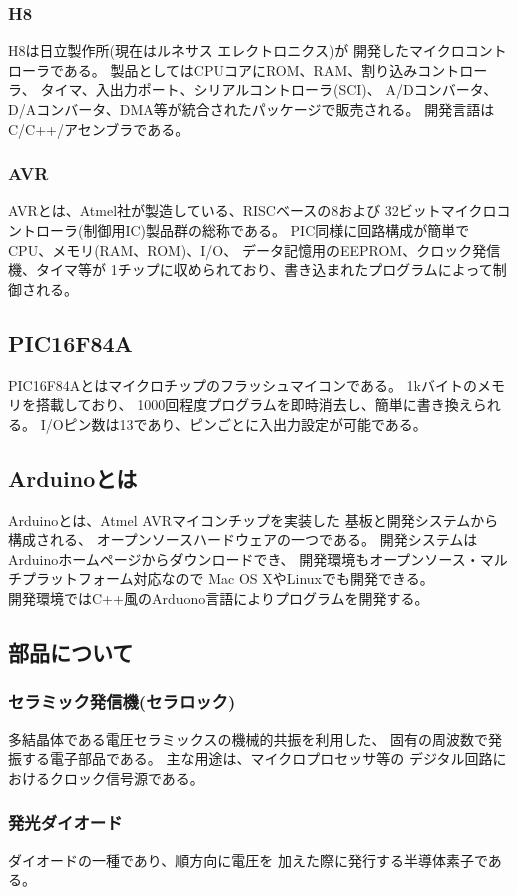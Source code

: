 \documentclass{jsarticle}
\begin{document}
\subsubsection{H8}
H8は日立製作所(現在はルネサス エレクトロニクス)が
開発したマイクロコントローラである。
製品としてはCPUコアにROM、RAM、割り込みコントローラ、
タイマ、入出力ポート、シリアルコントローラ(SCI)、
A/Dコンバータ、D/Aコンバータ、DMA等が統合されたパッケージで販売される。
開発言語はC/C++/アセンブラである。

\subsubsection{AVR}
AVRとは、Atmel社が製造している、RISCベースの8および
32ビットマイクロコントローラ(制御用IC)製品群の総称である。
PIC同様に回路構成が簡単でCPU、メモリ(RAM、ROM)、I/O、
データ記憶用のEEPROM、クロック発信機、タイマ等が
1チップに収められており、書き込まれたプログラムによって制御される。\par

\subsection{PIC16F84A}
PIC16F84Aとはマイクロチップのフラッシュマイコンである。
1kバイトのメモリを搭載しており、
1000回程度プログラムを即時消去し、簡単に書き換えられる。
I/Oピン数は13であり、ピンごとに入出力設定が可能である。

\subsection{Arduinoとは}
Arduinoとは、Atmel AVRマイコンチップを実装した
基板と開発システムから構成される、
オープンソースハードウェアの一つである。
開発システムはArduinoホームページからダウンロードでき、
開発環境もオープンソース・マルチプラットフォーム対応なので
Mac OS XやLinuxでも開発できる。\\
開発環境ではC++風のArduono言語によりプログラムを開発する。

\subsection{部品について}
\subsubsection{セラミック発信機(セラロック)}
多結晶体である電圧セラミックスの機械的共振を利用した、
固有の周波数で発振する電子部品である。
主な用途は、マイクロプロセッサ等の
デジタル回路におけるクロック信号源である。

\subsubsection{発光ダイオード}
ダイオードの一種であり、順方向に電圧を
加えた際に発行する半導体素子である。


\end{document}
